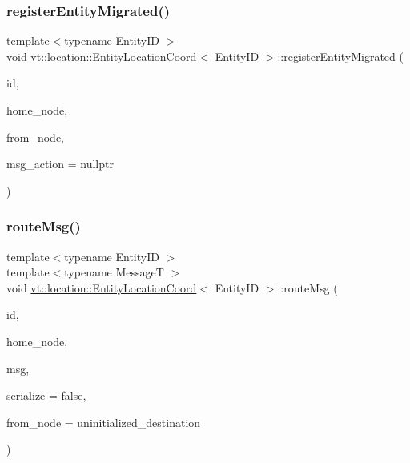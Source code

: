 \subsubsection{\texorpdfstring{register\+Entity\+Migrated()}{registerEntityMigrated()}}
{\footnotesize\ttfamily template$<$typename Entity\+ID $>$ \\
void \hyperlink{structvt_1_1location_1_1_entity_location_coord}{vt\+::location\+::\+Entity\+Location\+Coord}$<$ Entity\+ID $>$\+::register\+Entity\+Migrated (\begin{DoxyParamCaption}\item[{Entity\+ID const \&}]{id,  }\item[{\hyperlink{namespacevt_a866da9d0efc19c0a1ce79e9e492f47e2}{Node\+Type} const \&}]{home\+\_\+node,  }\item[{\hyperlink{namespacevt_a866da9d0efc19c0a1ce79e9e492f47e2}{Node\+Type} const \&\+\_\+\+\_\+attribute\+\_\+\+\_\+((unused))}]{from\+\_\+node,  }\item[{\hyperlink{namespacevt_1_1location_ad0a130e4d79e745543925240e13e8f08}{Loc\+Msg\+Action\+Type}}]{msg\+\_\+action = {\ttfamily nullptr} }\end{DoxyParamCaption})}

\mbox{\label{structvt_1_1location_1_1_entity_location_coord_af447be2a20fef8a60afd73a6eb05bfc7}} 
\subsubsection{\texorpdfstring{route\+Msg()}{routeMsg()}}
{\footnotesize\ttfamily template$<$typename Entity\+ID $>$ \\
template$<$typename MessageT $>$ \\
void \hyperlink{structvt_1_1location_1_1_entity_location_coord}{vt\+::location\+::\+Entity\+Location\+Coord}$<$ Entity\+ID $>$\+::route\+Msg (\begin{DoxyParamCaption}\item[{Entity\+ID const \&}]{id,  }\item[{\hyperlink{namespacevt_a866da9d0efc19c0a1ce79e9e492f47e2}{Node\+Type} const \&}]{home\+\_\+node,  }\item[{\hyperlink{namespacevt_ab2b3d506ec8e8d1540aede826d84a239}{Msg\+Shared\+Ptr}$<$ MessageT $>$}]{msg,  }\item[{bool const}]{serialize = {\ttfamily false},  }\item[{\hyperlink{namespacevt_a866da9d0efc19c0a1ce79e9e492f47e2}{Node\+Type}}]{from\+\_\+node = {\ttfamily uninitialized\+\_\+destination} }\end{DoxyParamCaption})}


